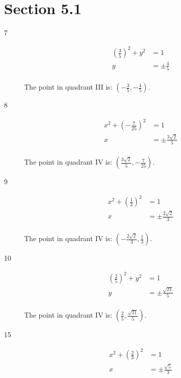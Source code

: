 \documentclass{exam}
\begin{document}
    \section{Section 5.1}
    \begin{description}

      \item[7]
        \begin{align*}
          \left( \frac{3}{5} \right)^2 + y^2 & = 1 \\
          y                                  & = \pm \frac{4}{5} \\
        \end{align*}

        The point in quadrant III is: $\boxed{ \left( -\frac{3}{5}, -\frac{4}{5} \right) }$.

      \item[8]
        \begin{align*}
          x^2 + \left( - \frac{7}{25} \right)^2 & = 1 \\
          x                                     & = \pm \frac{3 \sqrt{2}}{5} \\
        \end{align*}

        The point in quadrant IV is: $\boxed{ \left( \frac{3 \sqrt{2}}{5}, -\frac{7}{25} \right) }$.

      \item[9]
        \begin{align*}
          x^2 + \left( \frac{1}{3} \right)^2 & = 1 \\
          x                                  & = \pm \frac{2 \sqrt{2}}{3} \\
        \end{align*}

        The point in quadrant IV is: $\boxed{ \left( - \frac{2 \sqrt{2}}{3}, \frac{1}{3} \right) }$.

      \item[10]
        \begin{align*}
          \left( \frac{2}{5} \right)^2 + y^2 & = 1 \\
          y                                  & = \pm \frac{\sqrt{21}}{5} \\
        \end{align*}

        The point in quadrant IV is: $\boxed{ \left( \frac{2}{5}, \frac{\sqrt{21}}{5} \right) }$.

      \item[15]
        \begin{align*}
          x^2 + \left( \frac{2}{3} \right)^2 & = 1 \\
          x                                  & = \pm \frac{\sqrt{5}}{3} \\
        \end{align*}


\end{description}
\end{document}

